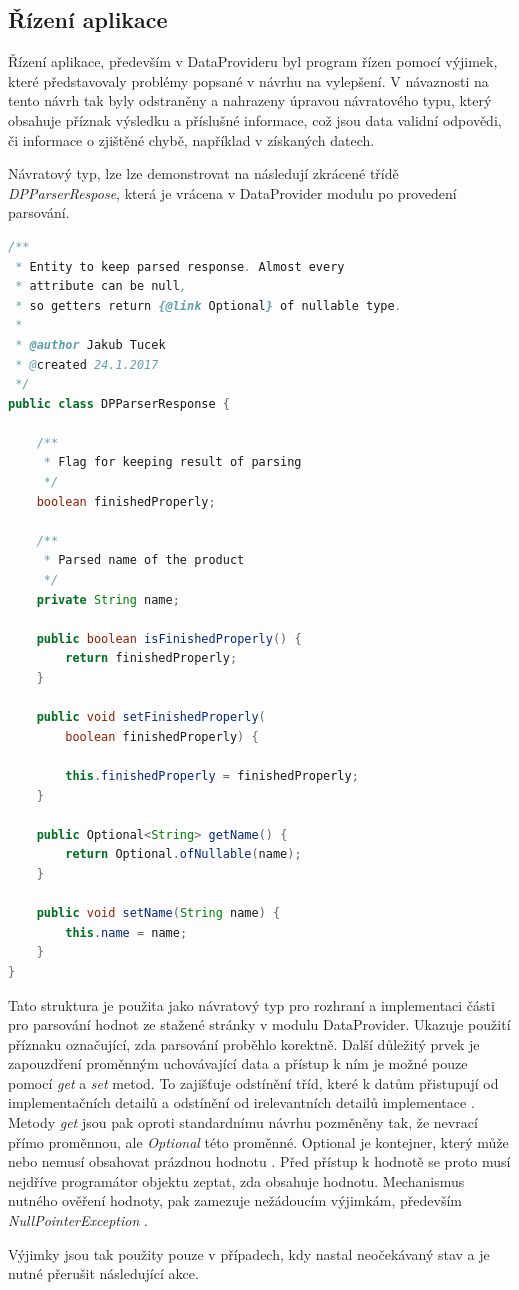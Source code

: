 \documentclass[thesis=B,czech]{FITthesis}[2012/06/26]
\begin{document}
\subsection{Řízení aplikace}
Řízení aplikace, především v DataProvideru byl program řízen pomocí výjimek, které představovaly problémy popsané v návrhu na vylepšení.
V návaznosti na tento návrh tak byly odstraněny a nahrazeny úpravou návratového typu, který obsahuje příznak výsledku 
a příslušné informace, což jsou data validní odpovědi, či informace o zjištěné chybě, například v získaných datech.
\par
Návratový typ, lze lze demonstrovat na následují zkrácené třídě \textit{DPParserRespose}, která je vrácena v DataProvider modulu
po provedení parsování.

\begin{lstlisting}[language=Java]
/**
 * Entity to keep parsed response. Almost every 
 * attribute can be null, 
 * so getters return {@link Optional} of nullable type.
 *
 * @author Jakub Tucek
 * @created 24.1.2017
 */
public class DPParserResponse {

    /**
     * Flag for keeping result of parsing
     */
    boolean finishedProperly;

    /**
     * Parsed name of the product
     */
    private String name;

    public boolean isFinishedProperly() {
        return finishedProperly;
    }

    public void setFinishedProperly(
    	boolean finishedProperly) {
    	
        this.finishedProperly = finishedProperly;
    }

    public Optional<String> getName() {
        return Optional.ofNullable(name);
    }

    public void setName(String name) {
        this.name = name;
    }
}
\end{lstlisting}

Tato struktura je použita jako návratový typ pro rozhraní a implementaci části pro parsování hodnot 
ze stažené stránky v modulu DataProvider. Ukazuje použití příznaku označující, zda parsování proběhlo korektně. Další důležitý prvek
je zapouzdření proměnným uchovávající data a přístup k ním je možné pouze pomocí \textit{get} a \textit{set} metod. To zajišťuje 
odstínění tříd, které k datům přistupují od implementačních detailů a odstínění od irelevantních detailů implementace \cite{encapsulation}.
Metody \textit{get} jsou pak oproti standardnímu návrhu pozměněny tak, že nevrací přímo proměnnou, ale \textit{Optional} této proměnné.
Optional je kontejner, který může nebo nemusí obsahovat prázdnou hodnotu \cite{optional}. Před přístup k hodnotě se proto musí nejdříve
programátor objektu zeptat, zda obsahuje hodnotu. Mechanismus nutného ověření hodnoty, pak zamezuje nežádoucím výjimkám, především \textit{NullPointerException} \cite{nullPointerException}.
\par
Výjimky jsou tak použity pouze v případech, kdy nastal neočekávaný stav a je nutné přerušit následující akce. 
\end{document}
